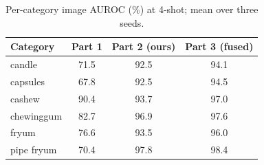 \begin{table}[t]
\centering
\small
\begin{tabular}{lccc}
\toprule
Category & Part 1 & Part 2 (ours) & Part 3 (fused) \\
\midrule
candle & 71.5 & 92.5 & 94.1 \\
capsules & 67.8 & 92.5 & 94.5 \\
cashew & 90.4 & 93.7 & 97.0 \\
chewinggum & 82.7 & 96.9 & 97.6 \\
fryum & 76.6 & 93.5 & 96.0 \\
pipe fryum & 70.4 & 97.8 & 98.4 \\
\bottomrule
\end{tabular}
\caption{Per-category image AUROC (\%) at 4-shot; mean over three seeds.}
\label{tab:percat}
\end{table}